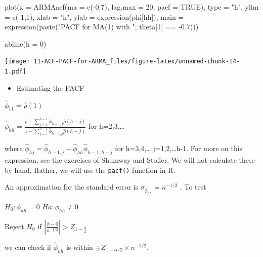 \documentclass[
]{book}
\newenvironment{Shaded}{\begin{snugshade}}{\end{snugshade}}
\newcommand{\AttributeTok}[1]{\textcolor[rgb]{0.77,0.63,0.00}{#1}}
\newcommand{\ConstantTok}[1]{\textcolor[rgb]{0.00,0.00,0.00}{#1}}
\newcommand{\DecValTok}[1]{\textcolor[rgb]{0.00,0.00,0.81}{#1}}
\newcommand{\FloatTok}[1]{\textcolor[rgb]{0.00,0.00,0.81}{#1}}
\newcommand{\FunctionTok}[1]{\textcolor[rgb]{0.00,0.00,0.00}{#1}}
\newcommand{\NormalTok}[1]{#1}
\newcommand{\SpecialCharTok}[1]{\textcolor[rgb]{0.00,0.00,0.00}{#1}}
\newcommand{\StringTok}[1]{\textcolor[rgb]{0.31,0.60,0.02}{#1}}
\providecommand{\tightlist}{%
  \setlength{\itemsep}{0pt}\setlength{\parskip}{0pt}}
\theoremstyle{definition}
\theoremstyle{definition}
\theoremstyle{definition}
\theoremstyle{definition}
\theoremstyle{remark}
\begin{document}
\begin{Shaded}
\begin{Highlighting}[]
\FunctionTok{plot}\NormalTok{(}\AttributeTok{x =} \FunctionTok{ARMAacf}\NormalTok{(}\AttributeTok{ma =} \FunctionTok{c}\NormalTok{(}\SpecialCharTok{{-}}\FloatTok{0.7}\NormalTok{), }\AttributeTok{lag.max =} \DecValTok{20}\NormalTok{, }\AttributeTok{pacf =} \ConstantTok{TRUE}\NormalTok{), }\AttributeTok{type =} \StringTok{"h"}\NormalTok{, }\AttributeTok{ylim =} \FunctionTok{c}\NormalTok{(}\SpecialCharTok{{-}}\DecValTok{1}\NormalTok{,}\DecValTok{1}\NormalTok{), }\AttributeTok{xlab =} \StringTok{"h"}\NormalTok{, }\AttributeTok{ylab =} \FunctionTok{expression}\NormalTok{(phi[hh]),}
       \AttributeTok{main =} \FunctionTok{expression}\NormalTok{(}\FunctionTok{paste}\NormalTok{(}\StringTok{"PACF for MA(1) with "}\NormalTok{, theta[}\DecValTok{1}\NormalTok{] }\SpecialCharTok{==} \SpecialCharTok{{-}}\FloatTok{0.7}\NormalTok{)))}
  
\FunctionTok{abline}\NormalTok{(}\AttributeTok{h =} \DecValTok{0}\NormalTok{)}
\end{Highlighting}
\end{Shaded}

\texttt{[image: 11-ACF-PACF-for-ARMA\_files/figure-latex/unnamed-chunk-14-1.pdf]}

\begin{itemize}
\tightlist
\item
  Estimating the PACF
\end{itemize}

\(\hat{\phi}_{11}=\hat{\rho}(1)\)

\(\hat{\phi}_{hh}=\frac{\hat{\rho}-\sum_{j=1}^{h-1}\hat{\phi}_{h-1,j}\hat{\rho}(h-j)}{1-\sum_{j=1}^{h-1}\hat{\phi}_{h-1,j}\hat{\rho}(h-j)}\) for h=2,3,\ldots{}

where \(\hat{\phi}_{hj}=\hat{\phi}_{h-1,j}-\hat{\phi}_{hh}\hat{\phi}_{h-1,h-j}\) for h=3,4,\ldots;j=1,2,\ldots h-1. For more on this expression, see the exercises of Shumway and Stoffer. We will not calculate these by hand. Rather, we will use the \texttt{pacf()} function in R.

An approximation for the standard error is \(\sigma_{\hat{\phi}_{hh}}=n^{-1/2}\) . To test

\(H_0:\phi_{hh} = 0\)
\(Ha:\phi_{hh} \ne 0\)

Reject \(H_0\) if \(|\frac{\hat{\phi}-0}{n^{-1/2}}| > Z_{1-\frac{\alpha}{2}}\)

we can check if \(\hat{\phi}_{hh}\) is within \(\pm Z_{1-\alpha/2} \times n^{-1/2}.\)
\end{document}
